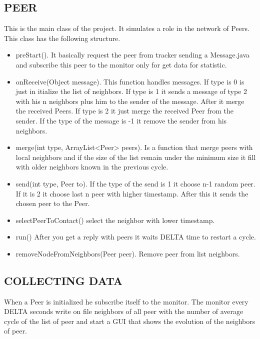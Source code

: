 \documentclass[a4paper,12pt,notitlepage]{article} %
\begin{document}
\subsection{PEER}
	This is the main class of the project. It simulates a role in the network of Peers. This class has the following 
structure.  
\begin{itemize}
\item preStart(). It basically request the peer from tracker sending a Message.java and subscribe this peer to the monitor 
only for get data for statistic.
\item onReceive(Object message). This function handles messages. If type is 0 is just in itialize the list of neighbors. If 
type is 1 it sends a message of type 2 with his n neighbors plus him to the sender of the message. After it merge the 
received Peers. If type is 2 it just merge the received Peer from the sender. If the type of the message is -1 it remove the 
sender from his neighbors.
\item merge(int type, ArrayList<Peer> peers). Is a function that merge peers with local neighbors and if the size of the 
list remain under the minimum size it fill with older neighbors known in the previous cycle.
\item send(int type, Peer to). If the type of the send is 1 it choose n-1 random peer. If it is 2 it choose last n peer 
with higher timestamp. After this it sends the chosen peer to the Peer.
\item selectPeerToContact() select the neighbor with lower timestamp.
\item run() After you get a reply with peers it waits DELTA time to restart a cycle.
\item removeNodeFromNeighbors(Peer peer). Remove peer from list neighbors.

\end{itemize}

\subsection{COLLECTING DATA}
	When a Peer is initialized he subscribe itself to the monitor. The monitor every DELTA seconds write on file 
neighbors of all peer with the number of average cycle of the list of peer and start a GUI that shows the evolution of the 
neighbors of peer.
\end{document}
